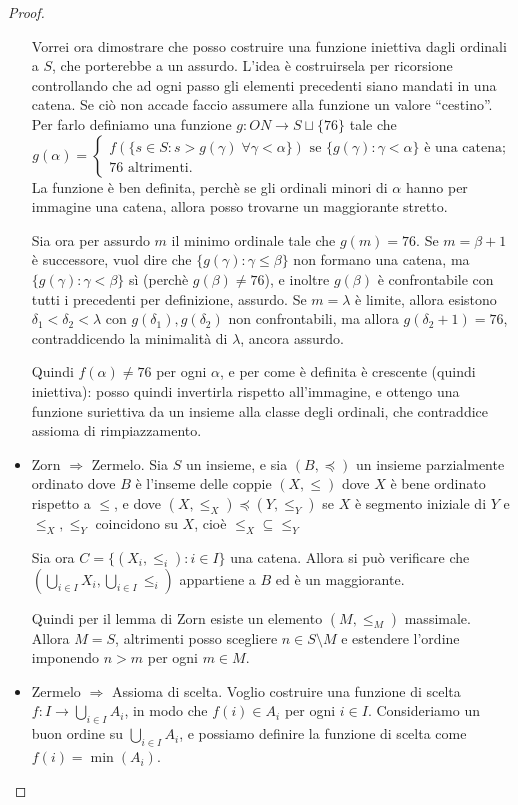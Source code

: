 \documentclass[a4paper,10pt,oneside]{article}
\newcommand{\trash}{76}
\theoremstyle{plain}
\theoremstyle{definition}
\theoremstyle{remark}
\begin{document}
\begin{proof}
\begin{itemize}
 Vorrei ora dimostrare che posso costruire una funzione iniettiva dagli ordinali a $S$, che porterebbe a un assurdo. L'idea è costruirsela per ricorsione controllando che ad ogni passo gli elementi precedenti siano mandati in una catena. Se ciò non accade faccio assumere alla funzione un valore ``cestino''.
 Per farlo definiamo una funzione $g: ON \rightarrow S \sqcup \{\trash\}$ tale che
 \[g(\alpha)=\left\{
 \begin{array}{l}
 f(\{s\in S:s>g(\gamma)\; \forall \gamma < \alpha\}) \textrm{ se } \{g(\gamma): \gamma < \alpha\} \textrm{ è una catena;}\\
 \trash \textrm{ altrimenti.}
 \end{array}
 \right.	
 \]
 La funzione è ben definita, perchè se gli ordinali minori di $\alpha$ hanno per immagine una catena, allora posso trovarne un maggiorante stretto.
	
 Sia ora per assurdo $m$ il minimo ordinale tale che $g(m)=\trash$. Se $m=\beta+1$ è successore, vuol dire che $\{g(\gamma):\gamma\le\beta\}$ non formano una catena, ma $\{g(\gamma):\gamma<\beta\}$ sì (perchè $g(\beta)\ne \trash$), e inoltre $g(\beta)$ è confrontabile con tutti i precedenti per definizione, assurdo. Se $m=\lambda$ è limite, allora esistono $\delta_1<\delta_2<\lambda$ con $g(\delta_1),g(\delta_2)$ non confrontabili, ma allora $g(\delta_2+1)=\trash$, contraddicendo la minimalità di $\lambda$, ancora assurdo.

 Quindi $f(\alpha)\ne\trash$ per ogni $\alpha$, e per come è definita è crescente (quindi iniettiva): posso quindi invertirla rispetto all'immagine, e ottengo una funzione suriettiva da un insieme alla classe degli ordinali, che contraddice assioma di rimpiazzamento.

 \item Zorn $\Rightarrow$ Zermelo. Sia $S$ un insieme, e sia $(B,\preceq)$ un insieme parzialmente ordinato dove $B$ è l'inseme delle coppie $(X,\le)$ dove $X$ è bene ordinato rispetto a $\le$, e dove $(X, \le_X) \preceq (Y,\le_Y)$ se $X$ è segmento iniziale di $Y$ e $\le_X, \le_Y$ coincidono su $X$, cioè $\le_X \subseteq \le_Y$
 
 Sia ora $C=\{(X_i,\le_i):i\in I\}$ una catena. Allora si può verificare che $(\bigcup_{i\in I}X_i,\bigcup_{i\in I}\le_i)$ appartiene a $B$ ed è un maggiorante.
 
 Quindi per il lemma di Zorn esiste un elemento $(M,\le_M)$ massimale. Allora $M=S$, altrimenti posso scegliere $n\in S\setminus M$ e estendere l'ordine imponendo $n>m$ per ogni $m\in M$.
 
 \item Zermelo $\Rightarrow$ Assioma di scelta. Voglio costruire una funzione di scelta $f: I  \rightarrow \bigcup_{i\in I}A_i$, in modo che $f(i)\in A_i$ per ogni $i\in I$. Consideriamo un buon ordine su $\bigcup_{i\in I}A_i$, e possiamo definire la funzione di scelta come $f(i)=\min(A_i)$.

\end{itemize}
\end{proof}
\end{document}
